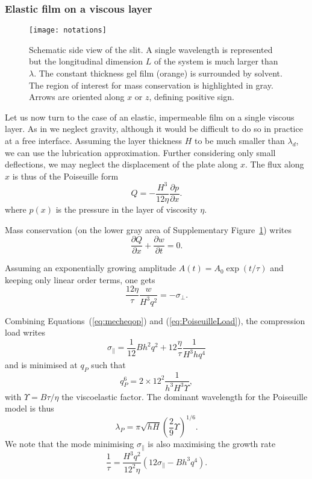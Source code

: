 \documentclass[twocolumn,superscriptaddress,showpacs,preprintnumbers,
amsmath,amssymb,prl]{revtex4-1}
\begin{document}
\subsubsection*{Elastic film on a viscous layer}

\begin{figure}
\texttt{[image: notations]}%
\caption{Schematic side view of the slit. A single wavelength is represented but the longitudinal dimension $L$ of the system is much larger than $\lambda$. The constant thickness gel film (orange) is surrounded by solvent. The region of interest for mass conservation is highlighted in gray. Arrows are oriented along $x$ or $z$, defining positive sign.}%
\label{fig:notations}%
\end{figure}

Let us now turn to the case of an elastic, impermeable film on a single viscous layer. As in \cite{Huang2002} we neglect gravity, although it would be difficult to do so in practice at a free interface. Assuming the layer thickness $H$ to be much smaller than $\lambda_d$, we can use the lubrication approximation. Further considering only small deflections, we may neglect the displacement of the plate along $x$. The flux along $x$ is thus of the Poiseuille form
\begin{equation}
Q = -\frac{H^3}{12\eta}\frac{\partial p}{\partial x}.
\label{eq:PoiseuilleFlux}
\end{equation}
where $p(x)$ is the pressure in the layer of viscosity $\eta$.

Mass conservation (on the lower gray area of Supplementary Figure~\ref{fig:notations}) writes
\begin{equation}
\frac{\partial Q}{\partial x} + \frac{\partial w}{\partial t} = 0.
\label{eq:conservation}
\end{equation}

Assuming an exponentially growing amplitude $A(t) = A_0 \exp(t/\tau)$ and keeping only linear order terms, one gets
\begin{equation}
\frac{12\eta}{\tau} \frac{w}{H^3q^2} = -\sigma_\perp.
\label{eq:PoiseuilleLoad}
\end{equation}

Combining Equations~(\ref{eq:mecheqop}) and (\ref{eq:PoiseuilleLoad}), the compression load writes
\begin{equation}
\sigma_\parallel = \frac{1}{12}B h^2 q^2 + 12\frac{\eta}{\tau}\frac{1}{H^3 h q^4}
\label{eq:sigma0P}
\end{equation}
and is minimised at $q_P$ such that
\begin{equation}
q_P^6 = 2\times 12^2 \frac{1}{h^3H^3\Upsilon},
\label{eq:qP}
\end{equation}
with $\Upsilon = B\tau/\eta$ the viscoelastic factor. The dominant wavelength for the Poiseuille model is thus
\begin{equation}
\lambda_P = \pi\sqrt{hH}\left(\frac{2}{9}\Upsilon\right)^{1/6}.
\end{equation}
%
We note that the mode minimising $\sigma_\parallel$ is also maximising the growth rate
\begin{equation}
\frac{1}{\tau} = \frac{H^3q^2}{12^2\eta}\left(12\sigma_\parallel - Bh^3q^4\right).
\end{equation}
\end{document}
